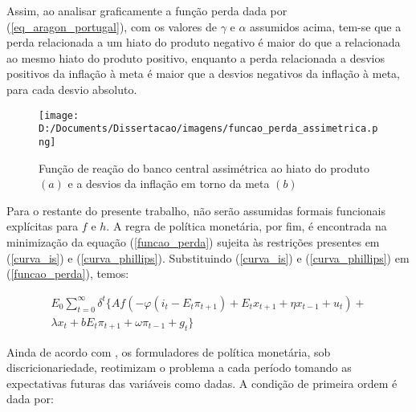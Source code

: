 \documentclass[
	article,			%
	11pt,				%
	oneside,			%
	a4paper,			%
	english,			%
	brazil,				%
	]{abntex2}
\begin{document}
	Assim, ao analisar graficamente a função perda dada por (\ref{eq_aragon_portugal}), com os valores de $\gamma$ e $\alpha$ assumidos acima, tem-se que a perda relacionada a um hiato do produto negativo é maior do que a relacionada ao mesmo hiato do produto positivo, enquanto a perda relacionada a desvios positivos da inflação à meta é maior que a desvios negativos da inflação à meta, para cada desvio absoluto.
		
			
	
	\begin{figure}
	\texttt{[image: D:/Documents/Dissertacao/imagens/funcao\_perda\_assimetrica.png]}
	\caption{Função de reação do banco central assimétrica ao hiato do produto $(a)$ e a desvios da inflação em torno da meta $(b)$}
	\label{fig:funcao reacao assimetrica}
	\end{figure}
	

	
	Para o restante do presente trabalho, não serão assumidas formais funcionais explícitas para $f$ e $h$. A regra de política monetária, por fim, é encontrada na minimização da equação (\ref{funcao_perda}) sujeita às restrições presentes em (\ref{curva_is}) e (\ref{curva_phillips}). Substituindo (\ref{curva_is}) e (\ref{curva_phillips}) em (\ref{funcao_perda}), temos:
	
	\begin{eqnarray}
		E_0\sum_{t=0}^{\infty}\delta^t \{ Af(-\varphi(i_t-E_t\pi_{t+1}) + E_tx_{t+1} + \eta x_{t-1} + u_t) +\nonumber \\ \lambda x_t + bE_t\pi_{t+1} + \omega \pi_{t-1} + g_t \}
	\end{eqnarray}
	
	Ainda de acordo com , os formuladores de política monetária, sob discricionariedade, reotimizam o problema a cada período tomando as expectativas futuras das variáveis como dadas. A condição de primeira ordem é dada por:
	
\end{document}
